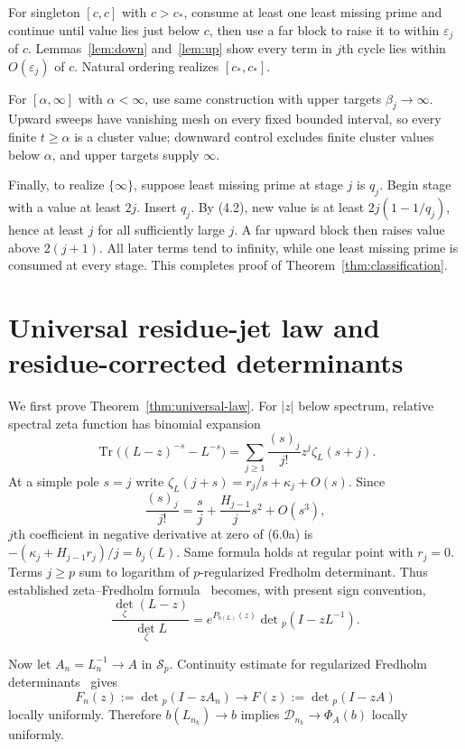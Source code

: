 \documentclass[11pt]{article}
\theoremstyle{definition}
\theoremstyle{remark}
\newcommand{\Tr}{\operatorname{Tr}}
\begin{document}
For singleton $[c,c]$ with $c>c_*$, consume at least one least missing prime and continue until
value lies just below $c$, then use a far block to raise it to within $\varepsilon_j$ of $c$.
Lemmas~\ref{lem:down}
and~\ref{lem:up} show every term in $j$th cycle lies within $O(\varepsilon_j)$ of $c$.  Natural
ordering realizes $[c_*,c_*]$.

For $[\alpha,\infty]$ with $\alpha<\infty$, use same construction with upper targets
$\beta_j\to\infty$.  Upward sweeps have vanishing mesh on every fixed bounded interval, so every
finite $t\geq\alpha$ is a cluster value; downward control excludes finite cluster values below
$\alpha$, and upper targets supply $\infty$.

Finally, to realize $\{\infty\}$, suppose least missing prime at stage $j$ is $q_j$.  Begin stage
with a value at least $2j$.  Insert $q_j$.  By (4.2), new value is at least
$2j(1-1/q_j)$, hence at least $j$ for all sufficiently large $j$.  A far upward block then raises
value above $2(j+1)$.  All later terms tend to infinity, while one least missing prime is consumed
at every stage.  This completes proof of Theorem~\ref{thm:classification}.

\section{Universal residue-jet law and residue-corrected determinants}
\label{sec:determinants}

We first prove Theorem~\ref{thm:universal-law}.  For $|z|$ below spectrum, relative spectral
zeta function has binomial expansion
\begin{equation}
 \Tr\bigl((L-z)^{-s}-L^{-s}\bigr)
 =\sum_{j\geq1}\frac{(s)_j}{j!}z^j\zeta_L(s+j).          \tag{6.0a}
\end{equation}
At a simple pole $s=j$ write
$\zeta_L(j+s)=r_j/s+\kappa_j+O(s)$.  Since
\[
 \frac{(s)_j}{j!}=\frac{s}{j}+\frac{H_{j-1}}j s^2+O(s^3),
\]
$j$th coefficient in negative derivative at zero of (6.0a) is
$-(\kappa_j+H_{j-1}r_j)/j=b_j(L)$.  Same formula holds at regular point with $r_j=0$.
Terms $j\geq p$ sum to logarithm of $p$-regularized Fredholm determinant.  Thus established
zeta--Fredholm formula~\cite{HartmannLesch2022} becomes, with present sign convention,
\begin{equation}
 \frac{\det_\zeta(L-z)}{\det_\zeta L}
 =e^{P_{b(L)}(z)}\det{}_p(I-zL^{-1}).                    \tag{6.0b}
\end{equation}

Now let $A_n=L_n^{-1}\to A$ in $\mathcal S_p$.  Continuity estimate for regularized Fredholm
determinants~\cite{Simon2005} gives
\begin{equation}
 F_n(z):=\det{}_p(I-zA_n)\longrightarrow
 F(z):=\det{}_p(I-zA)                                   \tag{6.0c}
\end{equation}
locally uniformly.  Therefore $b(L_{n_k})\to b$ implies
$\mathcal D_{n_k}\to\Phi_A(b)$ locally uniformly.
\end{document}
